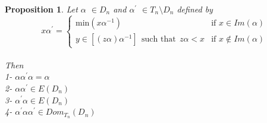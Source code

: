 \documentclass[10pt]{extarticle}
\numberwithin{equation}{section}
\numberwithin{bbb}{section}
\newtheorem{proposition}{Proposition}[section]
\numberwithin{equation}{section}
\begin{document}
\vspace{0.1cm}
\begin{proposition}\label{vx}
Let $\alpha$ $\in D_n$ and $\alpha^{\prime}$ $\in T_n \setminus D_n$ defined by
 \begin{equation*}
 \tag{1}
    x\alpha^{\prime}= \begin{cases}
    \text{min} (x\alpha^{-1}) & \text{if } x \in Im(\alpha)\\
    y \in[(z\alpha)\alpha^{-1}] \ \ \text{such that} \ \ z\alpha <x  & \text{if } x \notin Im(\alpha)
    \end{cases}
\end{equation*}\\
Then \\ 
1- $\alpha\alpha^{\prime}\alpha=\alpha$\\
2- $\alpha \alpha^{\prime} \in E(D_n)$\\
3- $\alpha^{\prime}\alpha \in E(D_n)$\\
4- $\alpha^{\prime} \alpha \alpha^{\prime} \in Dom_{T_{n}}(D_n)$

\end{proposition}  
\end{document}
